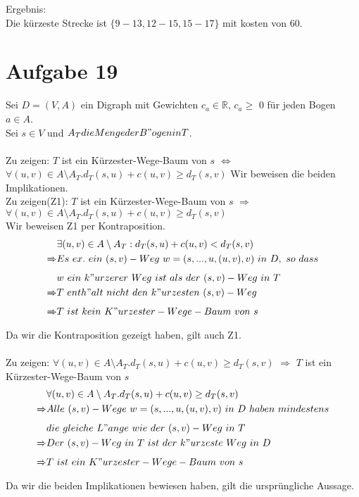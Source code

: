 \documentclass[a4paper,10pt,german]{scrartcl}
\begin{document}
Ergebnis:\\

Die k\"urzeste Strecke ist $\{9-13,12-15,15-17\} $ mit kosten von 60.

\section{Aufgabe 19}
Sei $D = (V,A)$ ein Digraph mit Gewichten $c_a \in \mathbb{R}$, $c_a \ge$ 0 f\"ur jeden Bogen $a \in A$.\\
Sei $s \in V$ und $A_T die Menge der B"ogen in T$.\\
\\
Zu zeigen: $T$ ist ein K\"urzester-Wege-Baum von $s$ $\Leftrightarrow$ $\forall (u,v) \in A \setminus A_T. d_T(s,u) + c(u,v) \ge d_T(s,v)$
Wir beweisen die beiden Implikationen.\\
Zu zeigen(Z1): $T$ ist ein Kürzester-Wege-Baum von $s$ $\Rightarrow$ $\forall (u,v) \in A \setminus A_T. d_T(s,u) + c(u,v) \ge d_T(s,v)$\\
Wir beweisen Z1 per Kontraposition.
\begin{align*}
	&\exists (u,v) \in A \setminus A_T: d_T (s,u) + c(u,v) < d_T (s,v)\\
	\xRightarrow{} &Es\ ex.\ ein\ (s,v)-Weg\ w = (s,...,u,(u,v),v)\ in\ D,\ so\ dass\\
	&w\ ein\ k"urzerer\ Weg\ ist\ als\ der\ (s,v)-Weg\ in\ T\\
	\xRightarrow{} &T\ enth"alt\ nicht\ den\ k"urzesten\ (s,v)-Weg\\
	\xRightarrow{} &T\ ist\ kein\ K"urzester-Wege-Baum\ von\ s\\
\end{align*}
Da wir die Kontraposition gezeigt haben, gilt auch Z1.\\
\\
Zu zeigen: $\forall (u,v) \in A \setminus A_T. d_T(s,u) + c(u,v) \ge d_T(s,v)$ $\Rightarrow$ $T$ ist ein Kürzester-Wege-Baum von $s$\\ 
\begin{align*}
	&\forall (u,v) \in A \setminus A_T. d_T (s,u) + c(u,v) \ge d_T (s,v)\\
	\xRightarrow{} &Alle\ (s,v)-Wege\ w = (s,...,u,(u,v),v)\ in\ D\ haben\ mindestens\\
	&die\ gleiche\ L"ange\ wie\ der\ (s,v)-Weg\ in\ T\\
	\xRightarrow{} &Der\ (s,v)-Weg\ in\ T\ ist\ der\ k"urzeste\ Weg\ in\ D \\
	\xRightarrow{} &T\ ist\ ein\ K"urzester-Wege-Baum\ von\ s\\
\end{align*}
Da wir die beiden Implikationen bewiesen haben, gilt die ursprüngliche Aussage.
\end{document}
